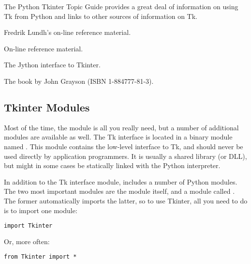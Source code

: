 \begin{seealso}
         {The Python Tkinter Topic Guide provides a great
            deal of information on using Tk from Python and links to
            other sources of information on Tk.}

         {Fredrik Lundh's on-line reference material.}

         {On-line reference material.}
        
         {The Jython interface to Tkinter.}

         {The book by John Grayson (ISBN 1-884777-81-3).}
\end{seealso}


\subsection{Tkinter Modules}

Most of the time, the  module is all you really
need, but a number of additional modules are available as well.  The
Tk interface is located in a binary module named .
This module contains the low-level interface to Tk, and should never
be used directly by application programmers. It is usually a shared
library (or DLL), but might in some cases be statically linked with
the Python interpreter.

In addition to the Tk interface module,  includes a
number of Python modules. The two most important modules are the
 module itself, and a module called
. The former automatically imports the latter, so
to use Tkinter, all you need to do is to import one module:

\begin{verbatim}
import Tkinter
\end{verbatim}

Or, more often:

\begin{verbatim}
from Tkinter import *
\end{verbatim}

